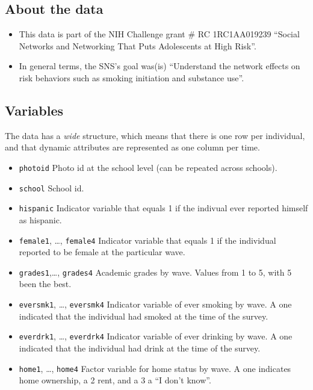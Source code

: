 \documentclass[]{book}
\begin{document}
\hypertarget{about-the-data}{%
\subsection{About the data}\label{about-the-data}}

\begin{itemize}
\item
  This data is part of the NIH Challenge grant \# RC 1RC1AA019239 ``Social
  Networks and Networking That Puts Adolescents at High Risk''.
\item
  In general terms, the SNS's goal was(is) ``Understand the network effects on
  risk behaviors such as smoking initiation and substance use''.
\end{itemize}

\hypertarget{variables}{%
\subsection{Variables}\label{variables}}

The data has a \emph{wide} structure, which means that there is one row per individual,
and that dynamic attributes are represented as one column per time.

\begin{itemize}
\item
  \texttt{photoid} Photo id at the school level (can be repeated across schools).
\item
  \texttt{school} School id.
\item
  \texttt{hispanic} Indicator variable that equals 1 if the indivual ever reported
  himself as hispanic.
\item
  \texttt{female1}, \ldots{}, \texttt{female4} Indicator variable that equals 1 if the individual
  reported to be female at the particular wave.
\item
  \texttt{grades1},\ldots{}, \texttt{grades4} Academic grades by wave. Values from 1 to 5, with 5
  been the best.
\item
  \texttt{eversmk1}, \ldots{}, \texttt{eversmk4} Indicator variable of ever smoking by wave. A one
  indicated that the individual had smoked at the time of the survey.
\item
  \texttt{everdrk1}, \ldots{}, \texttt{everdrk4} Indicator variable of ever drinking by wave.
  A one indicated that the individual had drink at the time of the survey.
\item
  \texttt{home1}, \ldots{}, \texttt{home4} Factor variable for home status by wave. A one
  indicates home ownership, a 2 rent, and a 3 a ``I don't know''.
\end{itemize}
\end{document}
